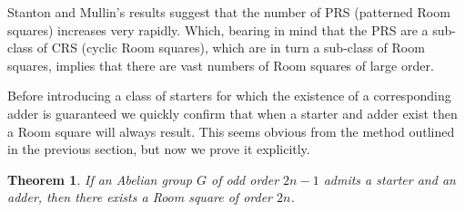 \documentclass[
  11pt,
  a4paper]{book}
\newtheorem{theorem}{Theorem}
\begin{document}
Stanton and Mullin's results suggest that the number of PRS
(patterned Room squares) increases very rapidly. Which,
bearing in mind that the PRS are a sub-class of CRS (cyclic
Room squares), which are in turn a sub-class of Room
squares, implies that there are vast numbers of Room squares
of large order.

Before introducing a class of starters for which the
existence of a corresponding adder is guaranteed we quickly
confirm that when a starter and adder exist then a Room
square will always result. This seems obvious from the
method outlined in the previous section, but now we prove it
explicitly.

\begin{theorem}
\label{thm:starter-adder}
If an Abelian group $G$ of odd order $2n - 1$ admits a starter
and an adder, then there exists a Room square of order $2n$.
\end{theorem}
\end{document}
